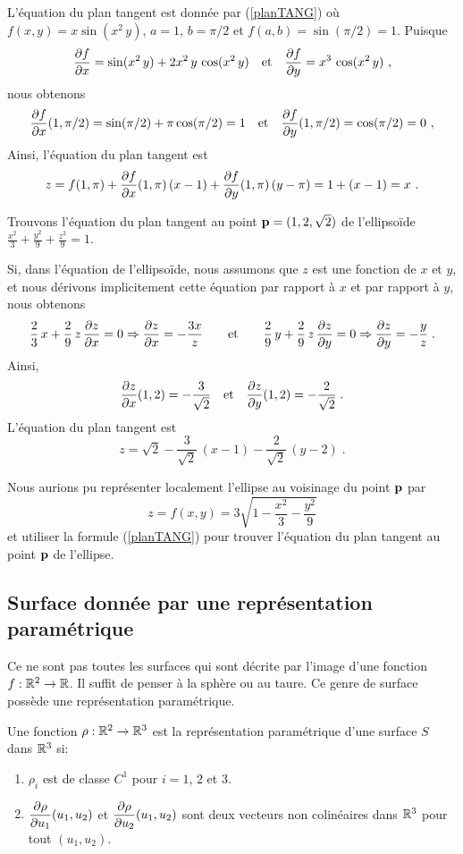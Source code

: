 {\begin{egg}
L'équation du plan tangent est donnée par (\ref{planTANG}) où
$f(x,y)=x\sin(x^2\,y)$, $a=1$, $b=\pi/2$ et $f(a,b) = \sin(\pi/2) =1$.
Puisque
\[
\frac{\partial f}{\partial x} = \sin(x^2\,y) + 2x^2\, y\,\cos(x^2\,y)
\quad \text{et} \quad
\frac{\partial f}{\partial y} = x^3\,\cos(x^2\,y) \ ,
\]
nous obtenons
\[
\frac{\partial f}{\partial x}(1,\pi/2) = \sin(\pi/2) + \pi \cos(\pi/2) = 1
\quad  \text{et} \quad
\frac{\partial f}{\partial y}(1,\pi/2) = \cos(\pi/2) =0 \ ,
\]
Ainsi, l'équation du plan tangent est
\[
z = f(1,\pi) + \frac{\partial f}{\partial x}(1,\pi) \, (x - 1)
+ \frac{\partial f}{\partial y}(1,\pi) \, (y - \pi)
= 1 + (x-1) = x \ .
\]
\end{egg}

\begin{egg}
Trouvons l'équation du plan tangent au point
$\mathbf{p} = (1,2,\sqrt{2})$ de l'ellipsoïde
$\displaystyle \frac{x^2}{3} + \frac{y^2}{9} + \frac{z^2}{9} = 1$.

Si, dans l'équation de l'ellipsoïde, nous assumons que $z$ est une fonction de
$x$ et $y$, et nous dérivons implicitement cette équation par rapport à $x$ et
par rapport à $y$, nous obtenons
\[
\frac{2}{3}\,x + \frac{2}{9}\,z\,\frac{\partial z}{\partial x} = 0
\Rightarrow \frac{\partial z}{\partial x} = -\frac{3x}{z}
\qquad \text{et} \qquad
\frac{2}{9}\,y + \frac{2}{9} \,z \, \frac{\partial z}{\partial y} = 0
\Rightarrow \frac{\partial z}{\partial y} = -\frac{y}{z} \; .
\]
Ainsi,
\[
\frac{\partial z}{\partial x}(1,2) = -\frac{3}{\sqrt{2}} \quad \text{et} \quad
\frac{\partial z}{\partial y}(1,2) = -\frac{2}{\sqrt{2}} \; .
\]
L'équation du plan tangent est
\[
z = \sqrt{2} -\frac{3}{\sqrt{2}}\,(x-1)
- \frac{2}{\sqrt{2}}\,(y-2) \; .
\]

Nous aurions pu représenter localement l'ellipse au voisinage du point
$\mathbf{p}$ par
\[
  z = f(x,y) = 3 \sqrt{1 - \frac{x^2}{3} - \frac{y^2}{9}}
\]
et utiliser la formule (\ref{planTANG}) pour trouver l'équation du
plan tangent au point $\mathbf{p}$ de l'ellipse.
\label{TPellipsoide}
\end{egg}

\subsection{Surface donnée par une représentation paramétrique}

Ce ne sont pas toutes les surfaces qui sont décrite par l'image d'une
fonction $f:\mathbb{R}^2 \to \mathbb{R}$.  Il suffit de penser à la sphère ou au
taure.  Ce genre de surface possède une représentation
paramétrique.

\begin{focus}{\dfn} 
Une fonction $\rho :\mathbb{R}^2 \to \mathbb{R}^3$ est la représentation
paramétrique d'une surface $S$ dans $\mathbb{R}^3$ si:
\begin{enumerate}
\item $\rho_i$ est de classe $C^1$ pour $i=1$, $2$ et $3$.
\item $\displaystyle \frac{\partial \rho}{\partial u_1}(u_1,u_2)$ et
$\displaystyle \frac{\partial \rho}{\partial u_2}(u_1,u_2)$ sont deux vecteurs
non colinéaires dans $\mathbb{R}^3$ pour tout $(u_1,u_2)$. 
\end{enumerate}
\end{focus}

}
